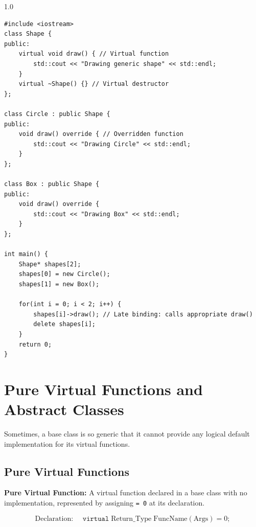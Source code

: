\documentclass[12pt,a4paper]{article}
\begin{document}
\begin{tcolorbox}[examplebox, title={Code Example: Runtime polymorphism using base pointer arrays}]
\begin{spacing}{1.0}
\begin{verbatim}
#include <iostream>
class Shape {
public:
    virtual void draw() { // Virtual function
        std::cout << "Drawing generic shape" << std::endl;
    }
    virtual ~Shape() {} // Virtual destructor
};

class Circle : public Shape {
public:
    void draw() override { // Overridden function
        std::cout << "Drawing Circle" << std::endl;
    }
};

class Box : public Shape {
public:
    void draw() override {
        std::cout << "Drawing Box" << std::endl;
    }
};

int main() {
    Shape* shapes[2];
    shapes[0] = new Circle();
    shapes[1] = new Box();
    
    for(int i = 0; i < 2; i++) {
        shapes[i]->draw(); // Late binding: calls appropriate draw()
        delete shapes[i];
    }
    return 0;
}
\end{verbatim}
\end{spacing}
\end{tcolorbox}

\section{Pure Virtual Functions and Abstract Classes}

Sometimes, a base class is so generic that it cannot provide any logical default implementation for its virtual functions.

\subsection{Pure Virtual Functions}
\begin{tcolorbox}[defbox]
\textbf{Pure Virtual Function:} A virtual function declared in a base class with no implementation, represented by assigning \texttt{= 0} at its declaration.
\end{tcolorbox}
\begin{equation}
  \text{Declaration: } \quad \texttt{virtual}\;\text{Return\_Type}\;\text{FuncName}(\text{Args}) = 0;
\end{equation}
\end{document}

